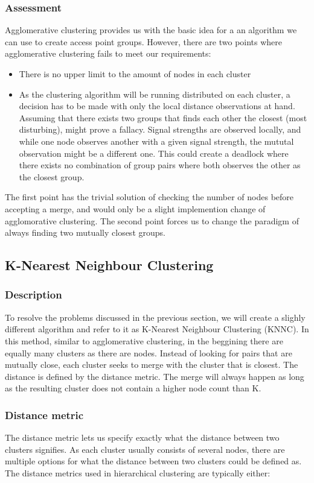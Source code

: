 \subsubsection{Assessment}
Agglomerative clustering provides us with the basic idea for a an algorithm we can use to create access point groups. However, there are two points where agglomerative clustering
fails to meet our requirements: 
\begin{itemize}
	\item There is no upper limit to the amount of nodes in each cluster
	\item As the clustering algorithm will be running distributed  on each cluster, a decision has to be made with only the local distance observations at hand.
		Assuming that there exists two groups that finds each other the closest (most disturbing), might prove a fallacy. Signal strengths are observed locally, and while one node observes another with a given signal strength,
		the mututal observation might be a different one. This could create a deadlock where there exists no combination of group pairs where both observes the other
		as the closest group. 
\end{itemize}

The first point has the trivial solution of checking the number of nodes before accepting a merge,  and would only be a slight implemention change of agglomorative clustering. 
The second point forces us to change the paradigm of always finding two mutually closest groups. 

\subsection{K-Nearest Neighbour Clustering}
\subsubsection{Description}
To resolve the problems discussed in the previous section, we will create a slighly different algorithm and refer to it as K-Nearest Neighbour Clustering (KNNC). 
In this method, similar to agglomerative clustering, in the beggining there are equally many clusters as there are nodes. Instead of looking for pairs that are mutually close,
each cluster seeks to merge with the cluster that is closest. The distance is defined by the distance metric. The merge will always happen as long as the resulting cluster does 
not contain a higher node count than K.

\subsubsection{Distance metric}
The distance metric lets us specify exactly what the distance between two clusters signifies. As each cluster usually consists of several nodes, there are multiple
options for what the distance between two clusters could be defined as. The distance metrics used in hierarchical clustering are typically either:

